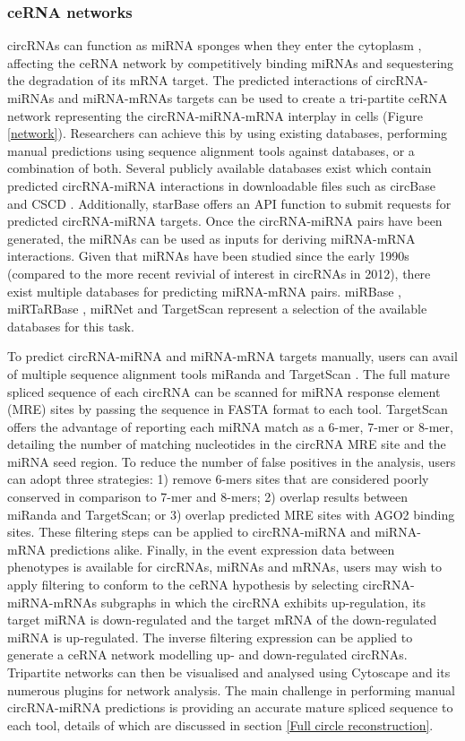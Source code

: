 \subsubsection{ceRNA networks}
circRNAs can function as miRNA sponges when they enter the cytoplasm \cite{Hansen2013Mar, findcirc}, affecting the ceRNA network by competitively binding miRNAs and sequestering the degradation of its mRNA target. The predicted interactions of circRNA-miRNAs and miRNA-mRNAs targets can be used to create a tri-partite ceRNA network representing the circRNA-miRNA-mRNA interplay in cells (Figure \ref{network}). Researchers can achieve this by using existing databases, performing manual predictions using sequence alignment tools against databases, or a combination of both. Several publicly available databases exist which contain predicted circRNA-miRNA interactions in downloadable files such as circBase \cite{circbase} and CSCD \cite{CSCD}. Additionally, starBase \cite{starbase} offers an API function to submit requests for predicted circRNA-miRNA targets. Once the circRNA-miRNA pairs have been generated, the miRNAs can be used as inputs for deriving miRNA-mRNA interactions. Given that miRNAs have been studied since the early 1990s (compared to the more recent revivial of interest in circRNAs in 2012), there exist multiple databases for predicting miRNA-mRNA pairs. miRBase \cite{mirbase}, miRTaRBase \cite{mirtarbase}, miRNet \cite{mirnet} and TargetScan \cite{Targetscan} represent a selection of the available databases for this task. \par
To predict circRNA-miRNA and miRNA-mRNA targets manually, users can avail of multiple sequence alignment tools miRanda \cite{miranda} and TargetScan \cite{Targetscan}. The full mature spliced sequence of each circRNA can be scanned for miRNA response element (MRE) sites by passing the sequence in FASTA format to each tool. TargetScan offers the advantage of reporting each miRNA match as a 6-mer, 7-mer or 8-mer, detailing the number of matching nucleotides in the circRNA MRE site and the miRNA seed region. To reduce the number of false positives in the analysis, users can adopt three strategies: 1) remove 6-mers sites that are considered poorly conserved in comparison to 7-mer and 8-mers; 2) overlap results between miRanda and TargetScan; or 3) overlap predicted MRE sites with AGO2 binding sites. These filtering steps can be applied to circRNA-miRNA and miRNA-mRNA predictions alike. Finally, in the event expression data between phenotypes is available for circRNAs, miRNAs and mRNAs, users may wish to apply filtering to conform to the ceRNA hypothesis by selecting circRNA-miRNA-mRNAs subgraphs in which the circRNA exhibits up-regulation, its target miRNA is down-regulated and the target mRNA of the down-regulated miRNA is up-regulated. The inverse filtering expression can be applied to generate a ceRNA network modelling up- and down-regulated circRNAs. Tripartite networks can then be visualised and analysed using Cytoscape \cite{cytoscape} and its numerous plugins for network analysis. The main challenge in performing manual circRNA-miRNA predictions is providing an accurate mature spliced sequence to each tool, details of which are discussed in section \ref{Full circle reconstruction}.

